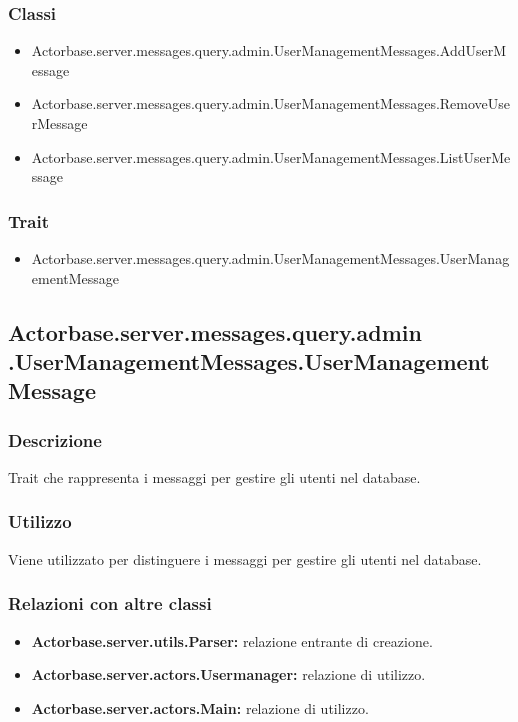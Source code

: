 \documentclass[a4paper]{article}
\begin{document}
			\subsubsection{Classi}
				\begin{itemize}
					\item Actorbase.server.messages.query.admin.UserManagementMessages.AddUserMessage
					\item Actorbase.server.messages.query.admin.UserManagementMessages.RemoveUserMessage
					\item Actorbase.server.messages.query.admin.UserManagementMessages.ListUserMessage
				\end{itemize}
				
			\subsubsection{Trait}
				\begin{itemize}
					\item Actorbase.server.messages.query.admin.UserManagementMessages.UserManagementMessage
				\end{itemize}
				
		\subsection{Actorbase.server.messages.query.admin \newline
		.UserManagementMessages.UserManagementMessage}
			\subsubsection{Descrizione}
				Trait che rappresenta i messaggi per gestire gli utenti nel database.
				
			\subsubsection{Utilizzo}
				Viene utilizzato per distinguere i messaggi per gestire gli utenti nel database.
				
			\subsubsection{Relazioni con altre classi}
				\begin{itemize}
					\item \textbf{Actorbase.server.utils.Parser:} relazione entrante di creazione.
					\item \textbf{Actorbase.server.actors.Usermanager:} relazione di utilizzo.
					\item \textbf{Actorbase.server.actors.Main:} relazione di utilizzo.
				\end{itemize}
\end{document}
